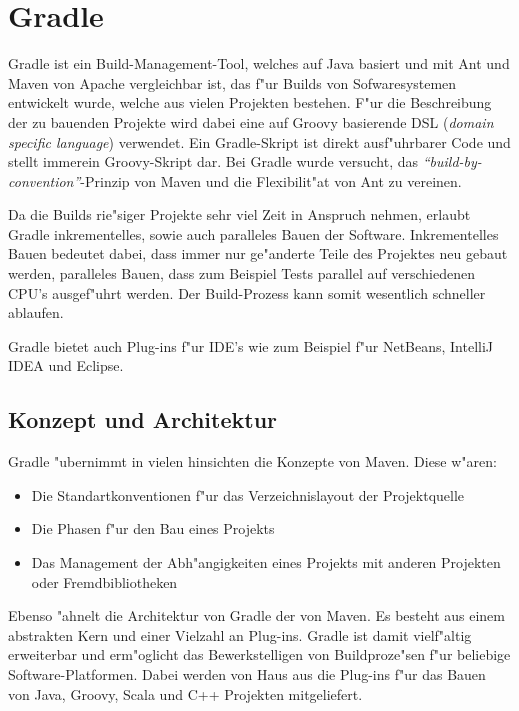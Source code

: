 \section{Gradle}
Gradle ist ein Build-Management-Tool, welches auf Java basiert und mit Ant und Maven von Apache vergleichbar ist, das f"ur Builds  von Sofwaresystemen entwickelt wurde, welche aus vielen Projekten bestehen.
F"ur die Beschreibung der zu bauenden Projekte wird dabei eine auf Groovy basierende DSL (\textit{domain specific language}) verwendet.
Ein Gradle-Skript ist direkt ausf"uhrbarer Code und stellt immerein Groovy-Skript dar.
Bei Gradle wurde versucht, das \textit{``build-by-convention''}-Prinzip von Maven und die Flexibilit"at von Ant zu vereinen.

Da die Builds rie"siger Projekte sehr viel Zeit in Anspruch nehmen, erlaubt Gradle inkrementelles, sowie auch paralleles Bauen der Software.
Inkrementelles Bauen bedeutet dabei, dass immer nur ge"anderte Teile des Projektes neu gebaut werden, paralleles Bauen, dass zum Beispiel Tests parallel auf verschiedenen CPU's ausgef"uhrt werden.
Der Build-Prozess kann somit wesentlich schneller ablaufen.

Gradle bietet auch Plug-ins f"ur IDE's wie zum Beispiel f"ur NetBeans, IntelliJ IDEA und Eclipse.

\subsection{Konzept und Architektur}
Gradle "ubernimmt in vielen hinsichten die Konzepte von Maven. Diese w"aren:
\begin{itemize}
	\item Die Standartkonventionen f"ur das Verzeichnislayout der Projektquelle
	\item Die Phasen f"ur den Bau eines Projekts
	\item Das Management der Abh"angigkeiten eines Projekts mit anderen Projekten oder Fremdbibliotheken
\end{itemize}
Ebenso "ahnelt die Architektur von Gradle der von Maven.
Es besteht aus einem abstrakten Kern und einer Vielzahl an Plug-ins. Gradle ist damit vielf"altig erweiterbar und erm"oglicht das Bewerkstelligen von Buildproze"sen f"ur beliebige Software-Platformen.
Dabei werden von Haus aus die Plug-ins f"ur das Bauen von Java, Groovy, Scala und C++ Projekten mitgeliefert.

